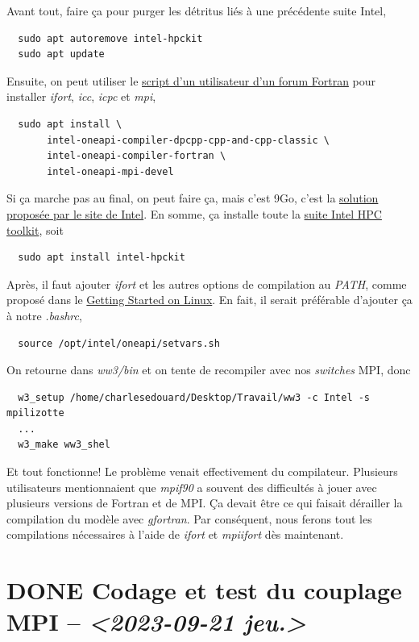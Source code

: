 \documentclass[10pt]{article}
\numberwithin{equation}{section}
\begin{document}
Avant tout, faire ça pour purger les détritus liés à une précédente suite Intel,
\begin{verbatim}
  sudo apt autoremove intel-hpckit
  sudo apt update
\end{verbatim}
Ensuite, on peut utiliser le \href{https://fortran-lang.discourse.group/t/how-to-install-only-a-few-compiler-components-of-the-intel-oneapi-kits-on-ubuntu/3834/4}{script d'un utilisateur d'un forum Fortran} pour installer \emph{ifort}, \emph{icc}, \emph{icpc} et \emph{mpi},
\begin{verbatim}
  sudo apt install \
       intel-oneapi-compiler-dpcpp-cpp-and-cpp-classic \
       intel-oneapi-compiler-fortran \
       intel-oneapi-mpi-devel
\end{verbatim}
Si ça marche pas au final, on peut faire ça, mais c'est 9Go, c'est la \href{https://www.intel.com/content/www/us/en/docs/oneapi/installation-guide-linux/2023-0/apt.html\#APT-PACKAGES}{solution proposée par le site de Intel}. 
En somme, ça installe toute la \href{https://www.intel.com/content/www/us/en/developer/tools/oneapi/toolkits.html\#gs.60r1wa}{suite Intel HPC toolkit}, soit
\begin{verbatim}
  sudo apt install intel-hpckit
\end{verbatim}
Après, il faut ajouter \emph{ifort} et les autres options de compilation au \emph{PATH}, comme proposé dans le \href{https://www.intel.com/content/www/us/en/docs/fortran-compiler/get-started-guide/2022-2/get-started-on-linux.html}{Getting Started on Linux}.
En fait, il serait préférable d'ajouter ça à notre \emph{.bashrc},
\begin{verbatim}
  source /opt/intel/oneapi/setvars.sh
\end{verbatim}
On retourne dans \emph{ww3/bin} et on tente de recompiler avec nos \emph{switches} MPI, donc
\begin{verbatim}
  w3_setup /home/charlesedouard/Desktop/Travail/ww3 -c Intel -s mpilizotte
  ...
  w3_make ww3_shel
\end{verbatim}
Et tout fonctionne! Le problème venait effectivement du compilateur.
Plusieurs utilisateurs mentionnaient que \emph{mpif90} a souvent des difficultés à jouer avec plusieurs versions de Fortran et de MPI.
Ça devait être ce qui faisait dérailler la compilation du modèle avec \emph{gfortran}.
Par conséquent, nous ferons tout les compilations nécessaires à l'aide de \emph{ifort} et \emph{mpiifort} dès maintenant.

\section{{\bfseries\sffamily DONE} Codage et test du couplage MPI -- \textit{<2023-09-21 jeu.>}}
\label{sec:org015fda1}
\end{document}
